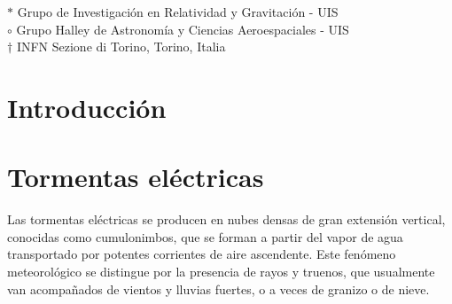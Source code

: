 \documentclass[12pt,oneside,openany,letter]{book}
\begin{document}
\begin{titlepage}



\vfill


\vfill



\vfill

$\ast$  Grupo de Investigaci\'on en Relatividad y Gravitaci\'on - UIS \\
$\circ$ Grupo Halley de Astronom\'ia y Ciencias Aeroespaciales - UIS
\\
$\dagger$ INFN Sezione di Torino, Torino, Italia\\
\vfill

\end{titlepage}

\tableofcontents
\listoffigures


\chapter*{Introducción}\label{introduccion}

\chapter{Tormentas eléctricas}\label{tormentas}
Las tormentas eléctricas se producen en nubes densas de gran extensión vertical, conocidas como cumulonimbos, que se forman a partir del vapor de agua transportado por potentes corrientes de aire ascendente. Este fenómeno meteorológico se distingue por la presencia de rayos y truenos, que usualmente van acompañados de vientos y lluvias fuertes, o a veces de granizo o de nieve. 
\end{document}
